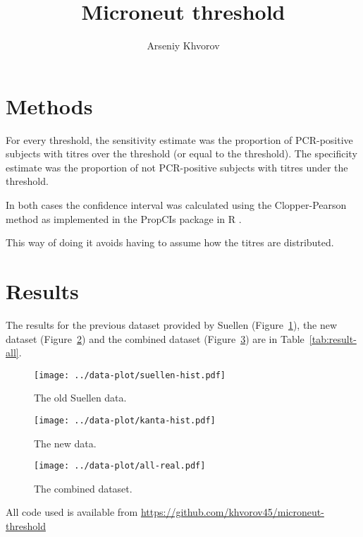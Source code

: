 \documentclass[11pt]{article}
\title{Microneut threshold}
\author{Arseniy Khvorov}
\begin{document}
\maketitle

\section{Methods}

For every threshold,
the sensitivity estimate
was the proportion of PCR-positive subjects with titres
over the threshold (or equal to the threshold).
The specificity estimate
was the proportion of not PCR-positive subjects
with titres under the threshold.

In both cases the confidence interval was calculated using the Clopper-Pearson
method as implemented in the PropCIs package \cite{PropCIs} in R \cite{R}.

This way of doing it avoids having to assume how the titres are distributed.

\section{Results}

The results for the previous dataset provided by Suellen
(Figure~\ref{fig:suellen}), the new dataset (Figure~\ref{fig:kanta}) and
the combined dataset (Figure~\ref{fig:combined})
are in Table~\ref{tab:result-all}.



\begin{figure}[htp]
    \centering
    \texttt{[image: ../data-plot/suellen-hist.pdf]}
    \caption{
        The old Suellen data.
    }
    \label{fig:suellen}
\end{figure}

\begin{figure}[htp]
    \centering
    \texttt{[image: ../data-plot/kanta-hist.pdf]}
    \caption{
        The new data.
    }
    \label{fig:kanta}
\end{figure}

\begin{figure}[htp]
    \centering
    \texttt{[image: ../data-plot/all-real.pdf]}
    \caption{
        The combined dataset.
    }
    \label{fig:combined}
\end{figure}



All code used is available from
\url{https://github.com/khvorov45/microneut-threshold}
\end{document}
